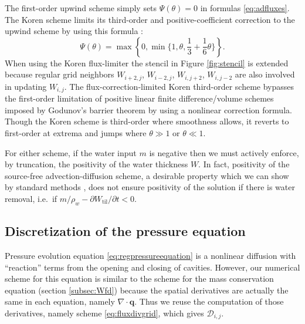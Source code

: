 \documentclass[gmd]{copernicus}   %
\begin{document}
The first-order upwind scheme simply sets $\Psi(\theta)=0$ in formulas \eqref{eq:adfluxes}.  The Koren scheme limits its third-order and positive-coefficient correction to the upwind scheme by using this formula \citep{HundsdorferVerwer2010}:
\begin{equation}
\Psi(\theta) = \max\left\{0,\min\Big\{1,\theta,\frac{1}{3}+\frac{1}{6} \theta\Big\}\right\}.  \label{eq:korenPsi}
\end{equation}
When using the Koren flux-limiter the stencil in Figure \ref{fig:stencil} is extended because regular grid neighbors $W_{i+2,j}$, $W_{i-2,j}$, $W_{i,j+2}$, $W_{i,j-2}$ are also involved in updating $W_{i,j}$.  The flux-correction-limited Koren third-order scheme bypasses the first-order limitation of positive linear finite difference/volume schemes imposed by Godunov's barrier theorem \citep[section I.7.1]{HundsdorferVerwer2010} by using a nonlinear correction formula.  Though the Koren scheme is third-order where smoothness allows, it reverts to first-order at extrema and jumps where $\theta \gg 1$ or $\theta \ll 1$.

For either scheme, if the water input $m$ is negative then we must actively enforce, by truncation, the positivity of the water thickness $W$.  In fact, positivity of the source-free advection-diffusion scheme, a desirable property which we can show by standard methods \citep{HundsdorferVerwer2010}, does not ensure positivity of the solution if there is  water removal, i.e.~if $m/\rho_w - \partial W_{\text{til}}/\partial t < 0$.

\subsection{Discretization of the pressure equation}  \label{subsec:Pfd}  Pressure evolution equation \eqref{eq:regpressureequation} is a nonlinear diffusion with ``reaction'' terms from the opening and closing of cavities.  However, our numerical scheme for this equation is similar to the scheme for the mass conservation equation (section \ref{subsec:Wfd}) because the spatial derivatives are actually the same in each equation, namely $\nabla\cdot\mathbf{q}$.  Thus we reuse the computation of those derivatives, namely scheme \eqref{eq:fluxdivgrid}, which gives $\mathcal{D}_{i,j}$.
\end{document}
